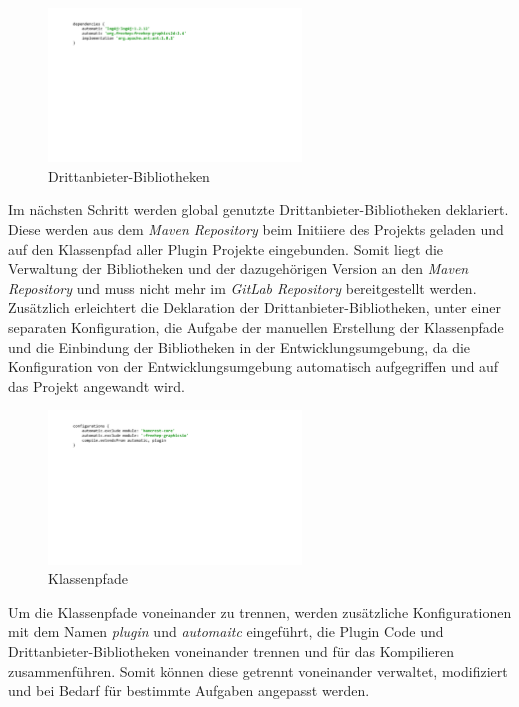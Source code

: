 	\begin{figure}[h!]
	  \centering
	  \includegraphics[width=0.6\textwidth]{material/images/gradle/dependencies.pdf}
	  \caption{Drittanbieter-Bibliotheken}
	  \label{fig:deps}
	\end{figure}

 	Im nächsten Schritt werden global genutzte Drittanbieter-Bibliotheken deklariert. Diese werden aus dem \textit{Maven Repository} beim Initiiere des Projekts geladen und auf den Klassenpfad aller Plugin Projekte eingebunden. Somit liegt die Verwaltung der Bibliotheken und der dazugehörigen Version an den \textit{Maven Repository} und muss nicht mehr im \textit{GitLab Repository} bereitgestellt werden.\newline
 	Zusätzlich erleichtert die Deklaration der Drittanbieter-Bibliotheken, unter einer separaten Konfiguration, die Aufgabe der manuellen Erstellung der Klassenpfade und die Einbindung der Bibliotheken in der Entwicklungsumgebung, da die Konfiguration von der Entwicklungsumgebung automatisch aufgegriffen und auf das Projekt angewandt wird.\bigbreak

	\begin{figure}[h!]
	  \centering
	  \includegraphics[width=0.6\textwidth]{material/images/gradle/configurations.pdf}
	  \caption{Klassenpfade}
	  \label{fig:kPath}
	\end{figure}

 	Um die Klassenpfade voneinander zu trennen, werden zusätzliche Konfigurationen mit dem Namen \textit{plugin} und \textit{automaitc} eingeführt, die Plugin Code und Drittanbieter-Bibliotheken voneinander trennen und für das Kompilieren zusammenführen. Somit können diese getrennt voneinander verwaltet, modifiziert und bei Bedarf für bestimmte Aufgaben angepasst werden.\bigbreak

